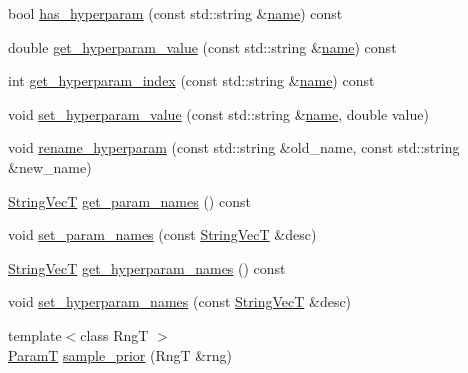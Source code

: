 \begin{DoxyCompactItemize}
\item 
bool \hyperlink{classmappel_1_1PointEmitterModel_afba2b17a81a506b0acd41616c8604412}{has\+\_\+hyperparam} (const std\+::string \&\hyperlink{classmappel_1_1Gauss1DMAP_ad6f9d453eec86b3d002909112cbe4b2c}{name}) const 
\item 
double \hyperlink{classmappel_1_1PointEmitterModel_a3282cc59d5c6010a51f671ba72997705}{get\+\_\+hyperparam\+\_\+value} (const std\+::string \&\hyperlink{classmappel_1_1Gauss1DMAP_ad6f9d453eec86b3d002909112cbe4b2c}{name}) const 
\item 
int \hyperlink{classmappel_1_1PointEmitterModel_ae13aa99689266d870b659d1045d595f1}{get\+\_\+hyperparam\+\_\+index} (const std\+::string \&\hyperlink{classmappel_1_1Gauss1DMAP_ad6f9d453eec86b3d002909112cbe4b2c}{name}) const 
\item 
void \hyperlink{classmappel_1_1PointEmitterModel_ade3e56cc00c43e9b7a521d8c4778d3b7}{set\+\_\+hyperparam\+\_\+value} (const std\+::string \&\hyperlink{classmappel_1_1Gauss1DMAP_ad6f9d453eec86b3d002909112cbe4b2c}{name}, double value)
\item 
void \hyperlink{classmappel_1_1PointEmitterModel_a447c83f0769e6dea2bfad68d957287d0}{rename\+\_\+hyperparam} (const std\+::string \&old\+\_\+name, const std\+::string \&new\+\_\+name)
\item 
\hyperlink{namespacemappel_aae88cf18bccfbb789a6019bcfbbfca68}{String\+VecT} \hyperlink{classmappel_1_1PointEmitterModel_aa910d1137d808041c0601f2dd3db96f0}{get\+\_\+param\+\_\+names} () const 
\item 
void \hyperlink{classmappel_1_1PointEmitterModel_a2abccbca47fc60700d73244e6c4dbe30}{set\+\_\+param\+\_\+names} (const \hyperlink{namespacemappel_aae88cf18bccfbb789a6019bcfbbfca68}{String\+VecT} \&desc)
\item 
\hyperlink{namespacemappel_aae88cf18bccfbb789a6019bcfbbfca68}{String\+VecT} \hyperlink{classmappel_1_1PointEmitterModel_a1b8bbd4bdddfb8f5236e8e50fe546c36}{get\+\_\+hyperparam\+\_\+names} () const 
\item 
void \hyperlink{classmappel_1_1PointEmitterModel_a6cdba258bda50cff162dc16a49383bb0}{set\+\_\+hyperparam\+\_\+names} (const \hyperlink{namespacemappel_aae88cf18bccfbb789a6019bcfbbfca68}{String\+VecT} \&desc)
\item 
{\footnotesize template$<$class RngT $>$ }\\\hyperlink{classmappel_1_1PointEmitterModel_a665ec6aea3aac139bb69a23c06d4b9a1}{ParamT} \hyperlink{classmappel_1_1PointEmitterModel_a031ef6c978371ce3774dffe811060842}{sample\+\_\+prior} (RngT \&rng)

\end{DoxyCompactItemize}
